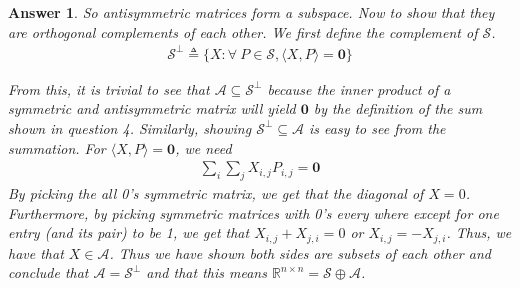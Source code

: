 \documentclass[12pt]{article}
\theoremstyle{colon}
\newtheorem*{answer}{Answer}
\begin{document}
\begin{answer}
  So antisymmetric matrices form a subspace. Now to show that they are orthogonal complements of each other. We first define the complement of $\mathcal{S}$.
  \begin{gather*}
    \mathcal{S}^\perp \triangleq \{ X: \forall \ P \in \mathcal{S}, \langle X, P \rangle = \bm{0} \}
  \end{gather*}

  From this, it is trivial to see that $\mathcal{A} \subseteq \mathcal{S}^\perp$ because the inner product of a symmetric and antisymmetric matrix will yield $\bm{0}$ by the definition of the sum shown in question 4. Similarly, showing $\mathcal{S}^\perp \subseteq \mathcal{A}$ is easy to see from the summation. For $\langle X, P \rangle = \bm{0}$, we need
  \begin{gather*}
    \sum_i \sum_j X_{i,j} P_{i,j} = \bm{0}
  \end{gather*}
  By picking the all 0's symmetric matrix, we get that the diagonal of $X = 0$. Furthermore, by picking symmetric matrices with 0's every where except for one entry (and its pair) to be 1, we get that $X_{i,j} + X_{j,i} = 0$ or $X_{i,j} = -X_{j,i}$. Thus, we have that $X \in \mathcal{A}$. Thus we have shown both sides are subsets of each other and conclude that $\mathcal{A} = \mathcal{S}^\perp$ and that this means $\mathbb{R}^{n \times n} = \mathcal{S} \oplus \mathcal{A}$.
\end{answer}
\end{document}
